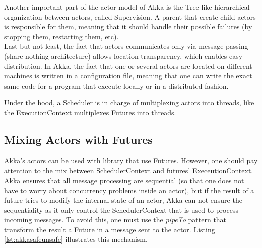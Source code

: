 Another important part of the actor model of Akka is the Tree-like hierarchical organization between actors, called Supervision.
A parent that create child actors is responsible for them, meaning that it should handle their possible failures (by stopping them,
restarting them, etc).
\\

Last but not least, the fact that actors communicates only via message passing (share-nothing architecture) allows location transparency, which
enables easy distribution. In Akka, the fact that one or several actors are located on different machines is written in a configuration file, meaning that
one can write the exact same code for a program that execute locally or in a distributed fashion.

Under the hood, a Scheduler is in charge of multiplexing actors into threads, like the ExecutionContext multiplexes Futures into threads.

\subsection{Mixing Actors with Futures}
\label{sec:mixingactorfuture}

Akka's actors can be used with library that use Futures. However, one should pay attention to the mix between SchedulerContext 
and futures' ExeceutionContext. Akka ensures that all message processing are sequential (so that one does not have to worry about concurrency problems inside
an actor), but if the result of a future tries to modify the internal state of an actor, Akka can not ensure the sequentiality as it only control the SchedulerContext
that is used to process incoming messages. To avoid this, one must use the \textit{pipeTo} pattern that transform the result a Future in a message sent to the actor.
Listing \ref{lst:akkasafeunsafe} illustrates this mechanism.

